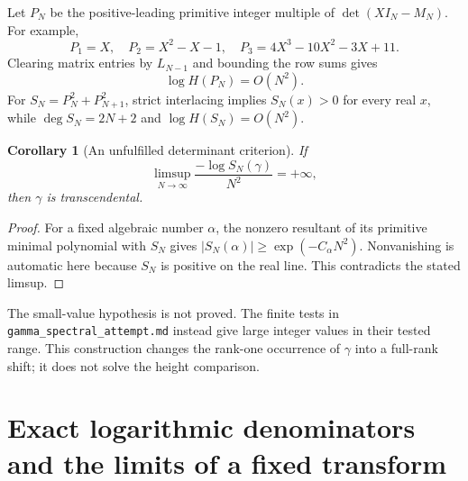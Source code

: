 \documentclass[11pt,a4paper]{article}
\newtheorem{corollary}[theorem]{Corollary}
\theoremstyle{definition}
\theoremstyle{remark}
\numberwithin{equation}{section}
\begin{document}
Let $P_N$ be the positive-leading primitive integer multiple of
$\det(XI_N-M_N)$.  For example,
\[
 P_1=X,\quad P_2=X^2-X-1,\quad
 P_3=4X^3-10X^2-3X+11.
\]
Clearing matrix entries by $L_{N-1}$ and bounding the row sums gives
\[
 \log H(P_N)=O(N^2).
\]
For $S_N=P_N^2+P_{N+1}^2$, strict interlacing implies
$S_N(x)>0$ for every real $x$, while
$\deg S_N=2N+2$ and $\log H(S_N)=O(N^2)$.

\begin{corollary}[An unfulfilled determinant criterion]
\label{ec:laguerre-criterion}
If
\[
 \limsup_{N\to\infty}\frac{-\log S_N(\gamma)}{N^2}=+\infty,
\]
then $\gamma$ is transcendental.
\end{corollary}
\begin{proof}
For a fixed algebraic number $\alpha$, the nonzero resultant of its
primitive minimal polynomial with $S_N$ gives
$|S_N(\alpha)|\ge\exp(-C_\alpha N^2)$.  Nonvanishing is automatic here
because $S_N$ is positive on the real line.  This contradicts the stated
limsup.
\end{proof}
The small-value hypothesis is not proved.  The finite tests in
\texttt{gamma\_spectral\_attempt.md} instead give large integer values
in their tested range.  This construction changes the rank-one occurrence
of $\gamma$ into a full-rank shift; it does not solve the height comparison.

\section{Exact logarithmic denominators and the limits of a fixed transform}
\label{ec:logden}
\end{document}
